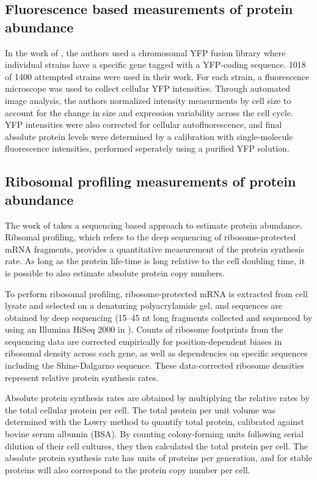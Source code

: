 \subsection{Fluorescence based measurements of protein abundance}
In the work of \cite{taniguchi2010}, the authors used a chromosomal YFP fusion
library where individual strains have a specific gene tagged with a YFP-coding
sequence. 1018 of 1400 attempted strains were used in their work. For each
strain, a fluorescence microscope was used to collect cellular YFP intensities.
Through automated image analysis, the authors normalized intensity measurments
by cell size to account for the change in size and expression variability across
the cell cycle. YFP intensities were also corrected for cellular
autofluorescence, and final absolute protein levels were determined by a
calibration with single-molecule fluorescence intensities, performed seperately
using a purified YFP solution.

\subsection{Ribosomal profiling measurements of protein abundance}
The work of \cite{li2014} takes a sequencing based approach to estimate protein
abundance. Ribsomal profiling, which refers to the deep sequencing of
ribosome-protected mRNA fragments, provides a quantitative measurement of the
protein synthesis rate.  As long as the protein life-time is long relative to
the cell doubling time, it is possible to  also estimate absolute protein copy
numbers.

To perform ribosomal profiling, ribosome-protected mRNA is extracted from cell
lysate  and selected on a denaturing polyacrylamide gel, and sequences are
obtained by deep sequencing (15–45 nt long fragments collected and sequenced  by
using an Illumina HiSeq 2000 in \cite{li2014}). Counts of ribosome footprints
from the sequencing data are corrected empirically for position-dependent biases
in ribosomal density across each gene, as well as dependencies on specific
sequences including the Shine-Dalgarno sequence. These data-corrected ribosome
densities represent relative protein synthesis rates.

Absolute protein synthesis rates are obtained by multiplying the relative rates
by the total cellular protein per cell. The total protein  per unit volume  was
determined with the Lowry method to quantify total protein, calibrated against
bovine serum albumin (BSA). By counting colony-forming units following serial
dilution of their cell cultures, they then calculated the total protein per
cell. The absolute protein synthesis rate has units of  proteins per generation,
and for stable proteins will also correspond to the protein  copy number per
cell.

